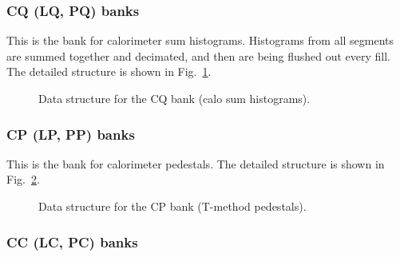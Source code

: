 \subsubsection*{CQ (LQ, PQ) banks}

This is the bank for calorimeter sum histograms. Histograms from all segments are summed together and decimated, and then are being flushed out every fill. The detailed structure is shown in Fig.~\ref{fig:CQBankFormat}.

\begin{figure}[htbp]
\centering
{}
\caption{Data structure for the CQ bank (calo sum histograms).}\label{fig:CQBankFormat}
\end{figure}

\subsubsection*{CP (LP, PP) banks}

This is the bank for calorimeter pedestals. The detailed structure is shown in Fig.~\ref{fig:CPBankFormat}.

\begin{figure}[htbp]
\centering
{} 
\caption{Data structure for the CP bank (T-method pedestals).}\label{fig:CPBankFormat}
\end{figure}

\subsubsection*{CC (LC, PC) banks}

